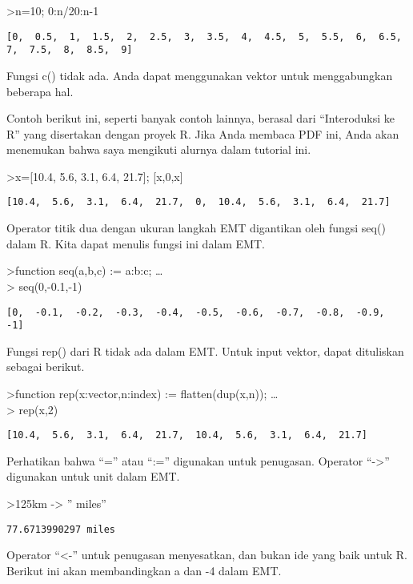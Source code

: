 \documentclass[
]{book}
\begin{document}
\textgreater n=10; 0:n/20:n-1

\begin{verbatim}
[0,  0.5,  1,  1.5,  2,  2.5,  3,  3.5,  4,  4.5,  5,  5.5,  6,  6.5,
7,  7.5,  8,  8.5,  9]
\end{verbatim}

Fungsi c() tidak ada. Anda dapat menggunakan vektor untuk menggabungkan beberapa hal.

Contoh berikut ini, seperti banyak contoh lainnya, berasal dari ``Interoduksi ke R'' yang disertakan dengan proyek R. Jika Anda membaca PDF ini, Anda akan menemukan bahwa saya mengikuti alurnya dalam tutorial ini.

\textgreater x={[}10.4, 5.6, 3.1, 6.4, 21.7{]}; {[}x,0,x{]}

\begin{verbatim}
[10.4,  5.6,  3.1,  6.4,  21.7,  0,  10.4,  5.6,  3.1,  6.4,  21.7]
\end{verbatim}

Operator titik dua dengan ukuran langkah EMT digantikan oleh fungsi seq() dalam R. Kita dapat menulis fungsi ini dalam EMT.

\textgreater function seq(a,b,c) := a:b:c; \ldots{}\\
\textgreater{} seq(0,-0.1,-1)

\begin{verbatim}
[0,  -0.1,  -0.2,  -0.3,  -0.4,  -0.5,  -0.6,  -0.7,  -0.8,  -0.9,  -1]
\end{verbatim}

Fungsi rep() dari R tidak ada dalam EMT. Untuk input vektor, dapat dituliskan sebagai berikut.

\textgreater function rep(x:vector,n:index) := flatten(dup(x,n)); \ldots{}\\
\textgreater{} rep(x,2)

\begin{verbatim}
[10.4,  5.6,  3.1,  6.4,  21.7,  10.4,  5.6,  3.1,  6.4,  21.7]
\end{verbatim}

Perhatikan bahwa ``='' atau ``:='' digunakan untuk penugasan. Operator ``-\textgreater{}'' digunakan untuk unit dalam EMT.

\textgreater125km -\textgreater{} '' miles''

\begin{verbatim}
77.6713990297 miles
\end{verbatim}

Operator ``\textless-'' untuk penugasan menyesatkan, dan bukan ide yang baik untuk R. Berikut ini akan membandingkan a dan -4 dalam EMT.
\end{document}
